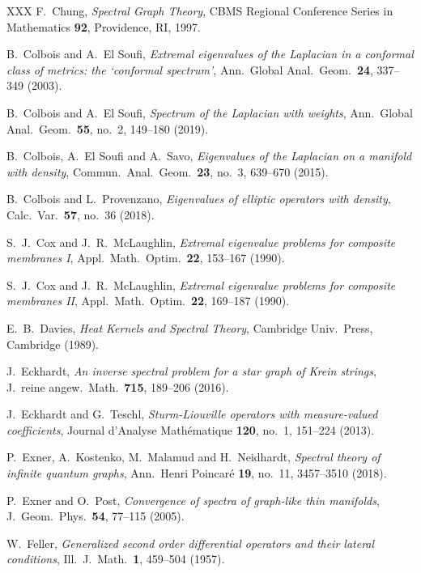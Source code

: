 \documentclass[reqno]{amsart}
\theoremstyle{plain}
\theoremstyle{definition}
\theoremstyle{remark}
\numberwithin{equation}{section}
\begin{document}
\begin{thebibliography}{XXX}
	F.\ Chung, {\em Spectral Graph Theory}, CBMS Regional Conference Series in Mathematics {\bf 92}, Providence, RI, 1997.
	
	B.\ Colbois and A.\ El Soufi, {\em Extremal eigenvalues of the Laplacian in a conformal class of metrics: the ‘conformal spectrum’}, Ann.\ Global Anal.\ Geom.\ \textbf{24}, 337--349 (2003).
	
	
	B.\ Colbois and A.\ El Soufi, {\em Spectrum of the Laplacian with weights}, Ann.\ Global Anal.\	Geom.\ \textbf{55}, no.~2, 149--180 (2019).
	
	B.\ Colbois, A.\ El Soufi and A.\ Savo, {\em Eigenvalues of the Laplacian on a manifold with density}, Commun.\ Anal.\ Geom.\ \textbf{23}, no.~3, 639--670 (2015).
	
	B.\ Colbois and L.\ Provenzano, {\em Eigenvalues of elliptic operators with density}, Calc.\ Var.\ \textbf{57}, no.~36 (2018).	
	
	S.\ J.\ Cox and J.\ R.\ McLaughlin, {\em Extremal eigenvalue problems for composite membranes I}, Appl.\ Math.\ Optim.\ \textbf{22}, 153--167 (1990).
	
	S.\ J.\ Cox and J.\ R.\ McLaughlin, {\em Extremal eigenvalue problems for composite membranes II}, Appl.\ Math.\ Optim.\ \textbf{22}, 169--187 (1990).
	
	
	E.\ B.\ Davies, {\em Heat Kernels and Spectral Theory}, Cambridge Univ.\ Press, Cambridge (1989).
	
	J.\ Eckhardt, {\em An inverse spectral problem for a star graph of Krein strings}, J.\ reine angew.\ Math.\ \textbf{715}, 189--206 (2016).
	
	J.\ Eckhardt and G.\ Teschl, {\em Sturm-Liouville operators with measure-valued coefficients}, Journal d'Analyse Mathématique \textbf{120}, no.~1, 151--224 (2013).
	
	P.\ Exner, A.\ Kostenko, M.\ Malamud and H.\ Neidhardt, \emph{Spectral theory of infinite quantum graphs}, Ann.\ Henri Poincar\'e {\bf 19}, no.~11, 3457--3510 (2018).
	
	P.\ Exner and O.\ Post, {\em Convergence of spectra of graph-like thin manifolds}, J.\ Geom.\ Phys.\ \textbf{54}, 77--115 (2005).
	
	W.\ Feller, {\em Generalized second order differential operators and their lateral conditions}, Ill.\ J.\ Math.\ \textbf{1}, 459--504 (1957).
	

\end{thebibliography}
\end{document}
